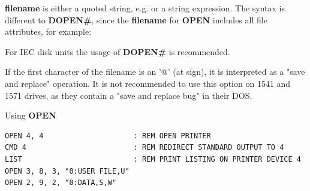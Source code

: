 \begin{description}[leftmargin=2cm,style=nextline]
                  {\bf filename} is either a quoted string, e.g.  or a string expression. The syntax is different to {\bf DOPEN\#}, since the {\bf filename} for {\bf OPEN} includes all file attributes, for example: 

\item [Remarks:]  For IEC disk units the usage of {\bf DOPEN\#} is recommended.

                  If the first character of the filename is an '@' (at sign), it is interpreted as a "save and replace" operation. It is not recommended to use this option on 1541 and 1571 drives, as they contain a "save and replace bug" in their DOS.

\item [Example:]  Using {\bf OPEN}

\begin{tcolorbox}[colback=black,coltext=white]
\verbatimfont{\codefont}
\begin{verbatim}
OPEN 4, 4                     : REM OPEN PRINTER
CMD 4                         : REM REDIRECT STANDARD OUTPUT TO 4
LIST                          : REM PRINT LISTING ON PRINTER DEVICE 4
OPEN 3, 8, 3, "0:USER FILE,U"
OPEN 2, 9, 2, "0:DATA,S,W"
\end{verbatim}
\end{tcolorbox}
\end{description}


\newpage
